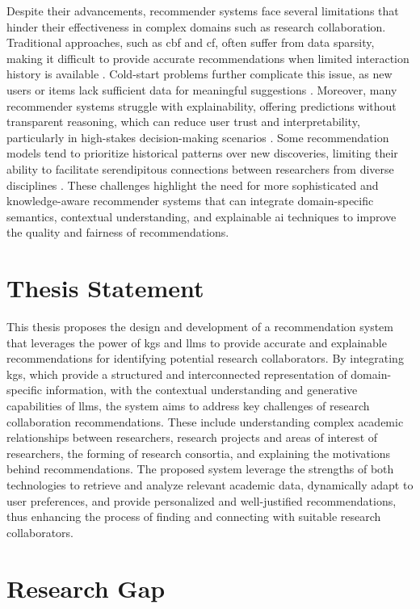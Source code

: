 Despite their advancements, recommender systems face several limitations that hinder their effectiveness in complex domains such as research collaboration.
Traditional approaches, such as \gls{cbf} and \gls{cf}, often suffer from data sparsity, making it difficult to provide accurate recommendations when limited interaction history is available \cite{Plexousakis2005, WEI201729}.
Cold-start problems further complicate this issue, as new users or items lack sufficient data for meaningful suggestions \cite{Lu2012}.
Moreover, many recommender systems struggle with explainability, offering predictions without transparent reasoning, which can reduce user trust and interpretability, particularly in high-stakes decision-making scenarios \cite{AIinRecSys}.
Some recommendation models tend to prioritize historical patterns over new discoveries, limiting their ability to facilitate serendipitous connections between researchers from diverse disciplines \cite{Jagadishwari2023,Iana2021}.
These challenges highlight the need for more sophisticated and knowledge-aware recommender systems that can integrate domain-specific semantics, contextual understanding, and explainable \gls{ai} techniques to improve the quality and fairness of recommendations.
%
\section{Thesis Statement}\label{sec:thesis-statement}
This thesis proposes the design and development of a recommendation system that leverages the power of \glspl{kg} and \glspl{llm} to provide accurate and explainable recommendations for identifying potential research collaborators.
By integrating \glspl{kg}, which provide a structured and interconnected representation of domain-specific information, with the contextual understanding and generative capabilities of \glspl{llm}, the system aims to address key challenges of research collaboration recommendations.
These include understanding complex academic relationships between researchers, research projects and areas of interest of researchers, the forming of research consortia, and explaining the motivations behind recommendations.
The proposed system leverage the strengths of both technologies to retrieve and analyze relevant academic data, dynamically adapt to user preferences, and provide personalized and well-justified recommendations, thus enhancing the process of finding and connecting with suitable research collaborators.
%
\section{Research Gap}\label{sec:research-gap}

%
